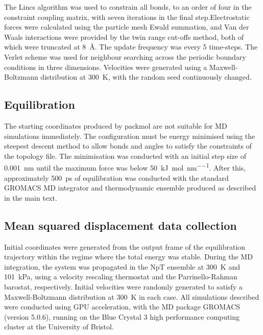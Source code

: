 The Lincs algorithm\cite{hess1997lincs} was used to constrain all bonds, to an order of four in the constraint coupling matrix, with seven iterations in the final step.Electrostatic forces were calculated using the particle mesh Ewald summation\cite{essmannSmoothParticleMesh1995}, and Van der Waals interactions were provided by the twin range cut-offs method, both of which were truncated at \SI{8}{\angstrom}. The update frequency was every \num{5} time-steps. The Verlet scheme\cite{pallFlexibleAlgorithmCalculating2013} was used for neighbour searching across the periodic boundary conditions in three dimensions. Velocities were generated using a Maxwell-Boltzmann distribution at \SI{300}{\kelvin}, with the random seed continuously changed.

\subsection{Equilibration}
 The starting coordinates produced by packmol\cite{martinez2009packmol} are not suitable for MD simulations immediately. The configuration must be energy minimised using the steepest descent method to allow bonds and angles to satisfy the constraints of the topology file. The minimisation was conducted with an initial step size of \SI{0.001}{\nano\meter} until the maximum force was below \SI{50}{\kilo\joule\per\mole\per\nano\meter}. After this, approximately \SI{500}{\pico\second} of equilibration was conducted with the standard GROMACS MD integrator and thermodynamic ensemble produced as described in the main text. 

\subsection{Mean squared displacement data collection}
Initial coordinates were generated from the output frame of the equilibration trajectory within the regime where the total energy was stable. During the MD integration, the system was propagated in the NpT ensemble at \SI{300}{\kelvin} and \SI{101}{\kilo\pascal}, using a velocity rescaling thermostat\cite{bussiCanonicalSamplingVelocity2007} and the Parrinello-Rahman barostat\cite{parrinelloPolymorphicTransitionsSingle1981}, respectively. Initial velocities were randomly generated to satisfy a Maxwell-Boltzmann distribution at \SI{300}{\kelvin} in each case. All simulations described were conducted using GPU acceleration, with the MD package GROMACS (version 5.0.6)\cite{abrahamGROMACSHighPerformance2015}, running on the Blue Crystal 3 high performance computing cluster at the University of Bristol.

